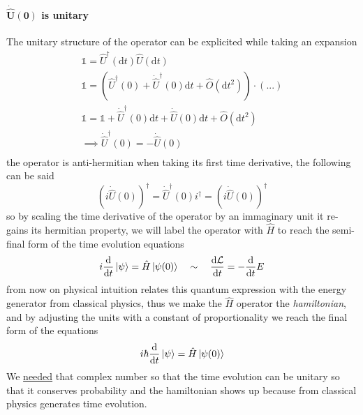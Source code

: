 \begin{multicols}{3}
  \paragraph{\textbf{$\boldsymbol{\dot{\hat{U}}(0)}$ is unitary}}
  The unitary structure of the operator can be explicited while taking an expansion
  \begin{equation*}
    \begin{gathered}
      \mathds{1} = \hat{U}^\dagger(\text{d}t) \hat{U}(\text{d}t) \\
      \mathds{1} = \left(\hat{U}^\dagger(0) + \dot{\hat{U}}^\dagger(0)\text{d}t + \hat{O}(\text{d}t^2)\right) \cdot\left(...\right) \\
      \mathds{1} = \mathds{1} + \dot{\hat{U}}^\dagger(0)\text{d}t + \dot{\hat{U}}(0)\text{d}t + \hat{O}(\text{d}t^2) \\
      \implies \dot{\hat{U}}^\dagger(0) = -\dot{\hat{U}}(0) \\
    \end{gathered}
  \end{equation*}
  the operator is anti-hermitian when taking its first time derivative, the following can be said
  \begin{equation*}
    (i \dot{\hat{U}}(0))^\dagger = \dot{\hat{U}}^\dagger(0) i^\dagger = (i \dot{\hat{U}}(0))^\dagger
  \end{equation*}
  so by scaling the time derivative of the operator by an immaginary unit it re-gains its hermitian property,
  we will label the operator with $\hat{H}$ to reach the semi-final form of the time evolution equations
  \begin{equation*}
    i\dv{t}\ket\psi = \hat{H}\ket{\psi(0)} \quad \sim \quad \dv{\mathcal{L}}{t} = -\dv{t}E
  \end{equation*}
  from now on physical intuition relates this quantum expression with the energy generator from classical physics, thus we make
  the $\hat{H}$ operator the \textit{hamiltonian}, and by adjusting the units with a constant of proportionality we reach the final form of the equations
  \begin{equation*}
    i\hbar\dv{t}\ket\psi = \hat{H}\ket{\psi(0)}
  \end{equation*}
  We \underline{needed} that complex number so that the time evolution can be unitary so that it conserves probability and
  the hamiltonian shows up because from classical physics generates time evolution.
\end{multicols}




